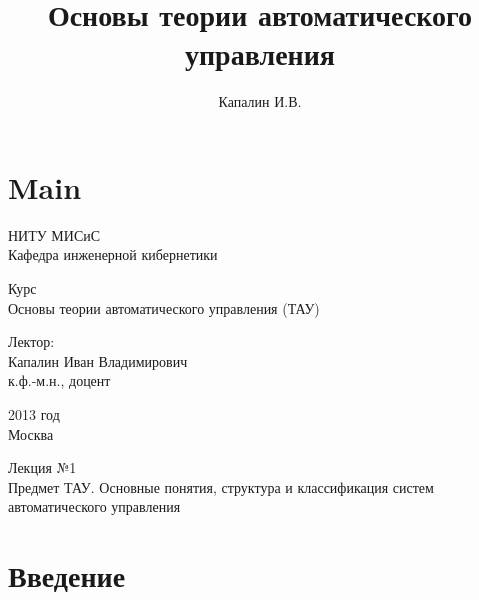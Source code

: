\documentclass[../TAU.tex]{subfiles}
\title[Основы теории автоматического управления]{Основы теории автоматического управления}
\author{ Капалин И.В.}
\theoremstyle{plain}
\theoremstyle{definition}
\theoremstyle{remark}
\theoremstyle{plain}
\begin{document}
\section{Main}




\begin{center}
{\small НИТУ МИСиС\\
Кафедра инженерной кибернетики
}
\end{center}

\vspace{1cm}

\begin{center}
Курс\\
{\LARGE Основы теории автоматического управления (ТАУ)}
\end{center}
\vspace{1cm}

\begin{flushright}
{\small
Лектор:\\
Капалин Иван Владимирович\\
к.ф.-м.н., доцент
}
\end{flushright}

\begin{center}
2013     год\\
Москва
\end{center}





\begin{center}
{\LARGE
Лекция №1\\
Предмет ТАУ. Основные понятия, структура и классификация систем автоматического управления}
\end{center}





\section{Введение}
\end{document}
